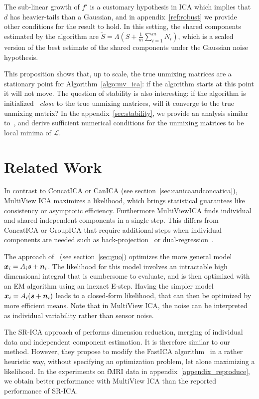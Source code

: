 %
The sub-linear growth of $f'$ is a customary hypothesis in ICA which implies that $d$ has heavier-tails than a Gaussian, and in appendix~\ref{ref:robust} we provide other conditions for the result to hold.
%
In this setting, the shared components estimated by the algorithm are $\tilde{S} = \Lambda (S + \frac1m \sum_{i=1}^m N_i)$, which is a scaled version of the best estimate of the shared components under the Gaussian noise hypothesis.

This proposition shows that, up to scale, the true unmixing matrices are a stationary point for Algorithm~\ref{algo:mv_ica}: if the algorithm starts at this point it will not move.
%
The question of stability is also interesting: if the algorithm is initialized ~\emph{close} to the true unmixing matrices, will it converge to the true unmixing matrix?
%
In the appendix~\ref{sec:stability}, we provide an analysis similar to~\cite{cardoso1998blind}, and derive sufficient numerical conditions for the unmixing matrices to be local minima of $\mathcal{L}$.
%

\section{Related Work}
\label{sec:permica}
In contrast to ConcatICA or CanICA (see section~\ref{sec:canicaandconcatica}),
MultiView ICA maximizes a likelihood, which brings statistical guarantees like
consistency or asymptotic efficiency. Furthermore MultiViewICA finds individual
and shared independent components in a single step. This differs from ConcatICA or
GroupICA that require additional steps when individual components are needed
such as back-projection~\cite{calhoun2001method} or dual-regression~\cite{beckmann2009group}.

The approach of~\cite{guo2008unified} (see section~\ref{sec:guo}) optimizes the more
general model $\boldsymbol{x}_i = A_i\boldsymbol{s} + \boldsymbol{n}_i$. 
The likelihood for this model involves an intractable high dimensional integral
that is cumbersome to evaluate, and is then optimized with an EM algorithm using
an inexact E-step.
Having the simpler model $\boldsymbol{x}_i = A_i(\boldsymbol{s} + \boldsymbol{n}_i)$ leads to a closed-form likelihood,
that can then be optimized by more efficient means.
Note that in MultiView ICA, the noise can be interpreted as individual variability rather than sensor noise. %


The SR-ICA approach of \cite{zhang2016searchlight} performs dimension reduction,
merging of individual data and independent component estimation. It is therefore similar to our method.
However, they propose to modify the FastICA algorithm~\cite{hyvarinen1999fast} in a rather heuristic way, without specifying an optimization problem, let alone maximizing a likelihood. In the experiments on fMRI data in appendix~\ref{appendix_reproduce}, we obtain better performance with MultiView ICA than the reported performance of SR-ICA.

